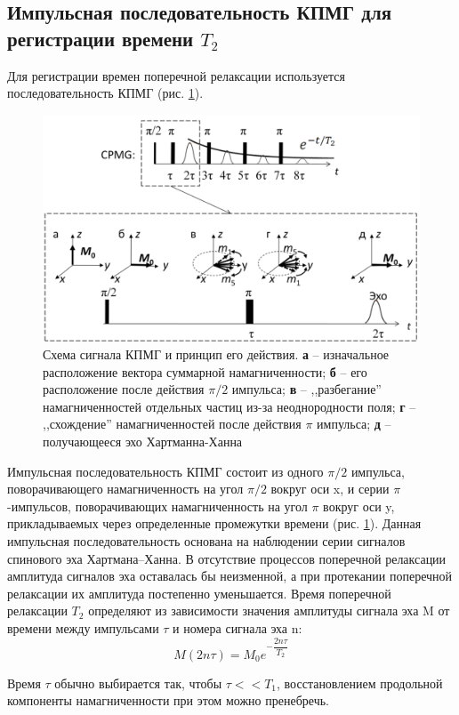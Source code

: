 \subsection{Импульсная последовательность КПМГ для регистрации времени $ T_2 $}
Для регистрации времен поперечной релаксации используется последовательность КПМГ (рис. \ref{fig:2019-02-11}).
\begin{figure}
	\centering
	\includegraphics[width=0.7\linewidth]{2019-02-11}
	\caption{Схема сигнала КПМГ и принцип его действия. \textbf{а} -- изначальное расположение вектора суммарной намагниченности; \textbf{б} -- его расположение после действия $ \pi /2 $ импульса; \textbf{в} -- ,,разбегание'' намагниченностей отдельных частиц из-за неоднородности поля; \textbf{г} -- ,,схождение'' намагниченностей после действия $ \pi $ импульса; \textbf{д} -- получающееся эхо Хартманна-Ханна}
	\label{fig:2019-02-11}
\end{figure}
Импульсная последовательность КПМГ состоит из одного $\pi /2$ импульса, поворачивающего намагниченность на угол $\pi /2$ вокруг оси x, и серии $\pi$-импульсов, поворачивающих намагниченность на угол $\pi$ вокруг оси y, прикладываемых через определенные промежутки времени (рис. \ref{fig:2019-02-11}). Данная импульсная последовательность основана на наблюдении серии сигналов спинового эха Хартмана–Ханна. В отсутствие процессов поперечной релаксации амплитуда сигналов эха оставалась бы неизменной, а при протекании поперечной релаксации их амплитуда постепенно уменьшается. Время поперечной релаксации $T_2$ определяют из зависимости значения амплитуды сигнала эха M от времени между импульсами $\tau$ и номера сигнала эха n:  
\begin{equation}
\label{eq:T2-def}
M(2n\tau)=M_0 e^{-\dfrac{2n\tau}{T_2}}
\end{equation}

Время $\tau$ обычно выбирается так, чтобы $\tau << T_1$, восстановлением продольной компоненты намагниченности при этом можно пренебречь. 

